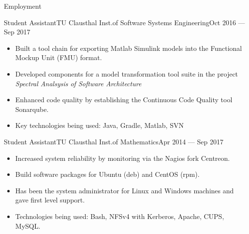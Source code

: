\documentclass[]{mcdowellcv}
\begin{document}
\begin{cvsection}{Employment}
\begin{cvsubsection}{Student Assistant}{TU Clausthal Inst.\@ of Software Systems Engineering}{Oct 2016 --- Sep 2017}
\bigskip
\begin{itemize}
\item Built a tool chain for exporting Matlab Simulink models into the Functional Mockup Unit (FMU) format.
\item Developed components for a model transformation tool suite in the project \emph{Spectral Analsysis of Software Architecture}
\item Enhanced code quality by establishing the Continuous Code Quality tool Sonarqube.
\item Key technologies being used: Java, Gradle, Matlab, SVN
\end{itemize}
\end{cvsubsection}

\begin{cvsubsection}{Student Assistant}{TU Clausthal Inst.\@ of Mathematics}{Apr 2014 --- Sep 2017}
\bigskip
\begin{itemize}
\item Increased system reliability by monitoring via the Nagios fork Centreon.
\item Build software packages for Ubuntu (deb) and CentOS (rpm).
\item Has been the system administrator for Linux and Windows machines and gave first level support.
\item Technologies being used: Bash, NFSv4 with Kerberos, Apache, CUPS, MySQL\@.
\end{itemize}
\end{cvsubsection}

\end{cvsection}
\end{document}
